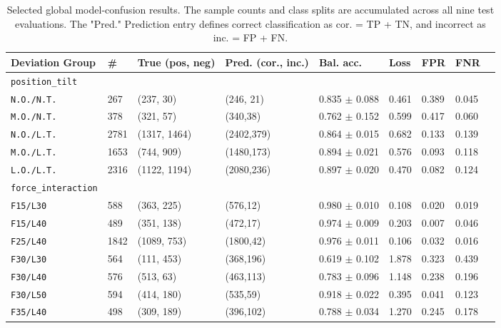 \begin{table}[htbp]
    \centering
    \caption{Selected global model-confusion results. The sample counts and class splits are accumulated across all nine test evaluations. The "Pred." Prediction entry defines correct classification as cor. = TP + TN, and incorrect as inc. = FP + FN.}
    \label{tab:da2_global_selected_groups}
    \scriptsize
    \begin{adjustbox}{width=\textwidth}
    \begin{tabular}{lllllllll}
        \toprule
        \textbf{Deviation Group} &
        \textbf{\#} &
        \textbf{True (pos, neg)} &
        \textbf{Pred. (cor., inc.)} &
        \textbf{Bal. acc.} &
        \textbf{Loss} &
        \textbf{FPR} &
        \textbf{FNR} \\
        \midrule
        \texttt{position\_tilt}\\
        \texttt{N.O./N.T.} & 267 & (237, 30) & (246, 21) & 0.835 $\pm$ 0.088 & 0.461 & 0.389 & 0.045 \\
        \texttt{M.O./N.T.} & 378 & (321, 57) & (340,38) & 0.762 $\pm$ 0.152 & 0.599 & 0.417 & 0.060 \\
        \texttt{N.O./L.T.} & 2781 & (1317, 1464) & (2402,379) & 0.864 $\pm$ 0.015 & 0.682 & 0.133 & 0.139 \\
        \texttt{M.O./L.T.} & 1653 & (744, 909) & (1480,173) & 0.894 $\pm$ 0.021 & 0.576 & 0.093 & 0.118 \\
        \texttt{L.O./L.T.} & 2316 & (1122, 1194) & (2080,236) & 0.897 $\pm$ 0.020 & 0.470 & 0.082 & 0.124 \\
        \midrule
        \texttt{force\_interaction} \\
        \texttt{F15/L30} & 588 & (363, 225) & (576,12) & 0.980 $\pm$ 0.010 & 0.108 & 0.020 & 0.019 \\
        \texttt{F15/L40} & 489 & (351, 138) & (472,17) & 0.974 $\pm$ 0.009 & 0.203 & 0.007 & 0.046 \\
        \texttt{F25/L40} & 1842 & (1089, 753) & (1800,42) & 0.976 $\pm$ 0.011 & 0.106 & 0.032 & 0.016 \\
        \texttt{F30/L30} & 564 & (111, 453) & (368,196) & 0.619 $\pm$ 0.102 & 1.878 & 0.323 & 0.439 \\
        \texttt{F30/L40} & 576 & (513, 63) & (463,113) & 0.783 $\pm$ 0.096 & 1.148 & 0.238 & 0.196 \\
        \texttt{F30/L50} & 594 & (414, 180) & (535,59) & 0.918 $\pm$ 0.022 & 0.395 & 0.041 & 0.123 \\
        \texttt{F35/L40} & 498 & (309, 189) & (396,102) & 0.788 $\pm$ 0.034 & 1.270 & 0.245 & 0.178 \\

\end{tabular}
\end{adjustbox}
\end{table}
